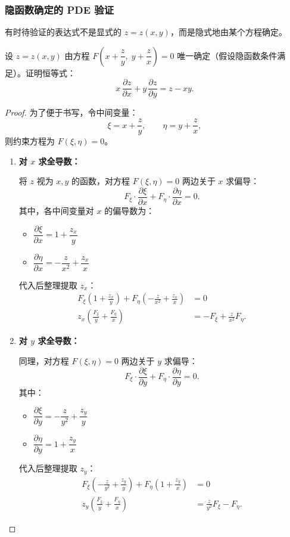 \documentclass[lang=cn,11pt]{elegantbook}
\begin{document}
\subsubsection*{隐函数确定的 PDE 验证}

有时待验证的表达式不是显式的 $z=z(x,y)$，而是隐式地由某个方程确定。

\begin{example} \label{ex:implicit-pde-identity}
设 $z=z(x,y)$ 由方程 $F\!\left(x+\dfrac{z}{y},\;y+\dfrac{z}{x}\right)=0$ 唯一确定（假设隐函数条件满足）。证明恒等式：
\[
x\,\frac{\partial z}{\partial x}+y\,\frac{\partial z}{\partial y}=z-xy.
\]
\end{example}

\begin{proof}
为了便于书写，令中间变量：
\[
\xi=x+\frac{z}{y},\qquad\eta=y+\frac{z}{x},
\]
则约束方程为 $F(\xi,\eta)=0$。

\begin{enumerate}
  \item \textbf{对 $x$ 求全导数：}
  
  将 $z$ 视为 $x,y$ 的函数，对方程 $F(\xi,\eta)=0$ 两边关于 $x$ 求偏导：
  \[
  F_\xi \cdot \frac{\partial \xi}{\partial x} + F_\eta \cdot \frac{\partial \eta}{\partial x} = 0.
  \]
  其中，各中间变量对 $x$ 的偏导数为：
  \begin{itemize}
      \item $\dfrac{\partial \xi}{\partial x} = 1 + \dfrac{z_x}{y}$
      \item $\dfrac{\partial \eta}{\partial x} = -\dfrac{z}{x^2} + \dfrac{z_x}{x}$
  \end{itemize}
  代入后整理提取 $z_x$：
  \begin{align*}
  F_\xi \left(1 + \frac{z_x}{y}\right) + F_\eta \left(-\frac{z}{x^2} + \frac{z_x}{x}\right) &= 0 \\[6pt]
  z_x \left(\frac{F_\xi}{y} + \frac{F_\eta}{x}\right) &= -F_\xi + \frac{z}{x^2}F_\eta.
  \end{align*}

  \item \textbf{对 $y$ 求全导数：}
  
  同理，对方程 $F(\xi,\eta)=0$ 两边关于 $y$ 求偏导：
  \[
  F_\xi \cdot \frac{\partial \xi}{\partial y} + F_\eta \cdot \frac{\partial \eta}{\partial y} = 0.
  \]
  其中：
  \begin{itemize}
      \item $\dfrac{\partial \xi}{\partial y} = -\dfrac{z}{y^2} + \dfrac{z_y}{y}$
      \item $\dfrac{\partial \eta}{\partial y} = 1 + \dfrac{z_y}{x}$
  \end{itemize}
  代入后整理提取 $z_y$：
  \begin{align*}
  F_\xi \left(-\frac{z}{y^2} + \frac{z_y}{y}\right) + F_\eta \left(1 + \frac{z_y}{x}\right) &= 0 \\[6pt]
  z_y \left(\frac{F_\xi}{y} + \frac{F_\eta}{x}\right) &= \frac{z}{y^2}F_\xi - F_\eta.
  \end{align*}


\end{enumerate}
\end{proof}
\end{document}
